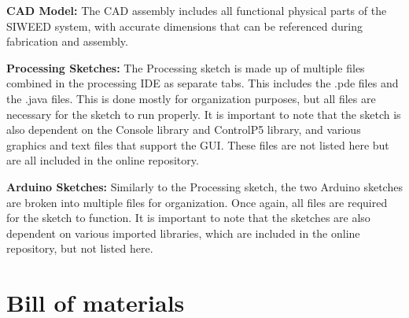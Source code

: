 \documentclass[11pt, letterpaper]{article}
\begin{document}
\textbf{CAD Model:}
The CAD assembly includes all functional physical parts of the SIWEED system, with accurate dimensions that can be referenced during fabrication and assembly.
\par


\textbf{Processing Sketches:}
The Processing sketch is made up of multiple files combined in the processing IDE as separate tabs. 
This includes the .pde files and the .java files.
This is done mostly for organization purposes, but all files are necessary for the sketch to run properly. 
It is important to note that the sketch is also dependent on the Console library and ControlP5 library, and various graphics and text files that support the GUI. 
These files are not listed here but are all included in the online repository.
\par


\textbf{Arduino Sketches:}
Similarly to the Processing sketch, the two Arduino sketches are broken into multiple files for organization.
Once again, all files are required for the sketch to function.
It is important to note that the sketches are also dependent on various imported libraries, which are included in the online repository, but not listed here.

\section{Bill of materials}

\end{document}
